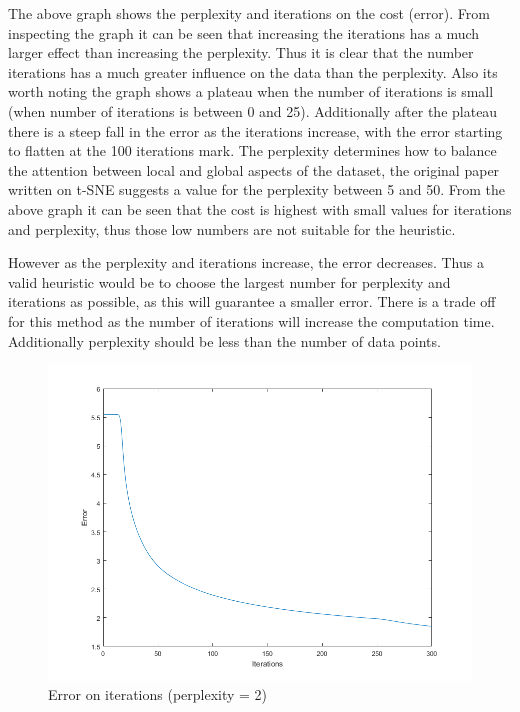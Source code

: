 The above graph shows the perplexity and iterations on the cost (error).
From inspecting the graph it can be seen that increasing the iterations has a much larger effect than increasing the perplexity.
Thus it is clear that the number iterations has a much greater influence on the data than the perplexity.
Also its worth noting the graph shows a plateau when the number of iterations is small (when number of iterations is between 0 and 25).
Additionally after the plateau there is a steep fall in the error as the iterations increase,
with the error starting to flatten at the 100 iterations mark.
The perplexity determines how to balance the attention between local and global aspects of the dataset,
the original paper written on t-SNE suggests a value for the perplexity between 5 and 50\cite{ictdbid:2777}.
From the above graph it can be seen that the cost is highest with small values for iterations and perplexity, thus those low numbers are not suitable for the heuristic.

However as the perplexity and iterations increase, the error decreases.
Thus a valid heuristic would be to choose the largest number for perplexity and iterations as possible,
as this will guarantee a smaller error.
There is a trade off for this method as the number of iterations will increase the computation time.
Additionally perplexity should be less than the number of data points\cite{wattenberg2016how}.

\begin{figure}[H]
    \includegraphics[width=\linewidth]{../../pracs/week6/images/q8_p2}
    \centering
    \caption{Error on iterations (perplexity = 2)\label{fig:2d_perp}}
\end{figure}

